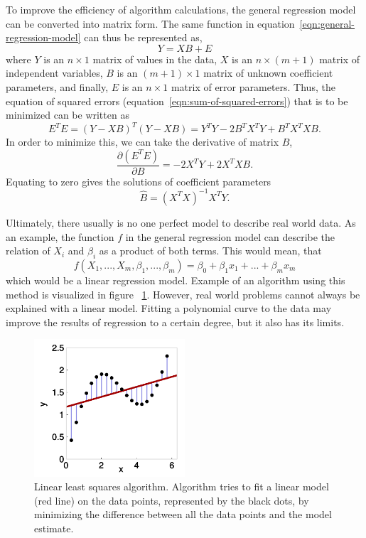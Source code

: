 To improve the efficiency of algorithm calculations,
the general regression model can be converted into matrix form.
The same function in equation~\ref{eqn:general-regression-model}
can thus be represented as,
\begin{equation}
    Y = XB+E
\end{equation}
where $Y$ is an $n\times1$ matrix of values in the data,
$X$ is an $n\times(m+1)$ matrix of independent variables,
$B$ is an $(m+1)\times1$ matrix of unknown coefficient parameters,
and finally, $E$ is an $n\times1$ matrix of error parameters.
Thus, the equation of squared errors (equation~\ref{eqn:sum-of-squared-errors})
that is to be minimized can be written as
\begin{equation}
    E^{T}E = (Y-XB)^{T}(Y-XB) = Y^{T}Y-2B^{T}X^{T}Y+B^{T}X^{T}XB.
\end{equation}
In order to minimize this, we can take the derivative of matrix $B$,
\begin{equation}
    \frac{\partial(E^{T}E)}{\partial B} = -2X^{T}Y + 2X^{T}XB.
\end{equation}
Equating to zero gives the solutions of coefficient parameters
\begin{equation}
    \hat{B} = (X^{T}X)^{-1}X^{T}Y.
\end{equation}

Ultimately,
there usually is no one perfect model to describe real world data.
As an example,
the function $f$ in the general regression model
can describe the relation of $X_{i}$ and $\beta_{i}$ as a product of both terms.
This would mean, that
\begin{equation}
    f(X_{1},...,X_{m},\beta_{1},...,\beta_{m})=\beta_{0}+\beta_{1}x_{1}+...+\beta_{m}x_{m}
\end{equation}
which would be a linear regression model.
Example of an algorithm using this method
is visualized in figure ~\ref{fig:linear-regression-example}.
However,
real world problems cannot always be explained with a linear model.
Fitting a polynomial curve to the data
may improve the results of regression to a certain degree,
but it also has its limits.

\begin{figure}[htb]
    \centering
    \includegraphics[width=0.5\textwidth]{./appendices/linear-regression}
    \caption{Linear least squares algorithm.
    Algorithm tries to fit a linear model (red line) on the data points,
        represented by the black dots,
        by minimizing the difference between all the data points
        and the model estimate.~\cite{stulp2015many}
        \label{fig:linear-regression-example}}
\end{figure}

